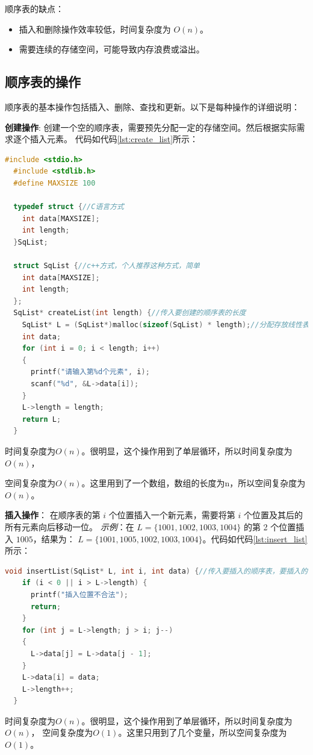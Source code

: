 \documentclass[lang=cn,newtx,10pt,scheme=chinese]{../elegantbook}
\begin{document}
顺序表的缺点：
\begin{itemize}
    \item 插入和删除操作效率较低，时间复杂度为 $O(n)$。
    \item 需要连续的存储空间，可能导致内存浪费或溢出。
\end{itemize}

\subsection{顺序表的操作}
顺序表的基本操作包括插入、删除、查找和更新。以下是每种操作的详细说明：

\textbf{创建操作}:
创建一个空的顺序表，需要预先分配一定的存储空间。然后根据实际需求逐个插入元素。
代码如代码\ref{lst:create_list}所示：
\begin{lstlisting}[language=C++, caption={顺序表的创建示例代码}, label={lst:create_list}]
  #include <stdio.h>
  #include <stdlib.h>
  #define MAXSIZE 100

  typedef struct {//C语言方式
    int data[MAXSIZE];
    int length;
  }SqList;

  struct SqList {//c++方式，个人推荐这种方式，简单
    int data[MAXSIZE];
    int length;
  };
  SqList* createList(int length) {//传入要创建的顺序表的长度
    SqList* L = (SqList*)malloc(sizeof(SqList) * length);//分配存放线性表的空间
    int data;
    for (int i = 0; i < length; i++)
    {
      printf("请输入第%d个元素", i);
      scanf("%d", &L->data[i]);
    }
    L->length = length;
    return L;
  }
  \end{lstlisting}

时间复杂度为$O(n)$。很明显，这个操作用到了单层循环，所以时间复杂度为$O(n)$，

空间复杂度为$O(n)$。这里用到了一个数组，数组的长度为n，所以空间复杂度为$O(n)$。

\textbf{插入操作}：
在顺序表的第 $i$ 个位置插入一个新元素，需要将第 $i$ 个位置及其后的所有元素向后移动一位。
\textit{示例}：在 $L = \{1001, 1002, 1003, 1004\}$ 的第 2 个位置插入 $1005$，结果为：
$L = \{1001, 1005, 1002, 1003, 1004\}$。代码如代码\ref{lst:insert_list}所示：
\begin{lstlisting}[language=C++, caption={顺序表的插入示例代码}, label={lst:insert_list}]
  void insertList(SqList* L, int i, int data) {//传入要插入的顺序表，要插入的位置，要插入的数据
    if (i < 0 || i > L->length) {
      printf("插入位置不合法");
      return;
    }
    for (int j = L->length; j > i; j--)
    {
      L->data[j] = L->data[j - 1];
    }
    L->data[i] = data;
    L->length++;
  }
  \end{lstlisting}
时间复杂度为$O(n)$。很明显，这个操作用到了单层循环，所以时间复杂度为$O(n)$，
空间复杂度为$O(1)$。这里只用到了几个变量，所以空间复杂度为$O(1)$。
\end{document}
